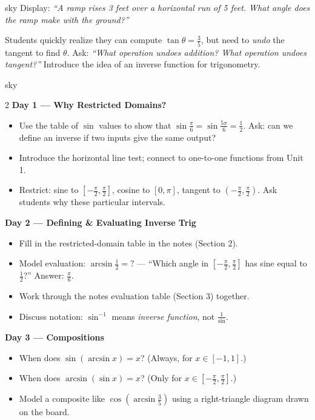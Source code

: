 \documentclass[10pt]{article}
\begin{document}
\begin{skillbox}[Hook]{sky}
    Display: \textit{``A ramp rises 3 feet over a horizontal run of 5 feet.
    What angle does the ramp make with the ground?''}

    Students quickly realize they can compute $\tan\theta = \tfrac{3}{5}$, but
    need to \emph{undo} the tangent to find $\theta$.  Ask: \textit{``What
    operation undoes addition?  What operation undoes tangent?''}  Introduce
    the idea of an inverse function for trigonometry.
\end{skillbox}

\begin{skillbox}[Lesson]{sky}
\begin{multicols}{2}
\textbf{Day 1 --- Why Restricted Domains?}
\begin{itemize}[leftmargin=1.4em, itemsep=2pt]
    \item Use the table of $\sin$ values to show that $\sin\tfrac{\pi}{6} =
          \sin\tfrac{5\pi}{6} = \tfrac{1}{2}$. Ask: can we define an inverse
          if two inputs give the same output?
    \item Introduce the horizontal line test; connect to one-to-one functions
          from Unit 1.
    \item Restrict: sine to $[-\tfrac{\pi}{2}, \tfrac{\pi}{2}]$, cosine to
          $[0,\pi]$, tangent to $(-\tfrac{\pi}{2}, \tfrac{\pi}{2})$.  Ask
          students why these particular intervals.
\end{itemize}

\columnbreak

\textbf{Day 2 --- Defining \& Evaluating Inverse Trig}
\begin{itemize}[leftmargin=1.4em, itemsep=2pt]
    \item Fill in the restricted-domain table in the notes (Section 2).
    \item Model evaluation: $\arcsin\tfrac{1}{2} = ?$ --- ``Which angle in
          $[-\tfrac{\pi}{2}, \tfrac{\pi}{2}]$ has sine equal to $\tfrac{1}{2}$?''
          Answer: $\tfrac{\pi}{6}$.
    \item Work through the notes evaluation table (Section 3) together.
    \item Discuss notation: $\sin^{-1}$ means \emph{inverse function}, not
          $\frac{1}{\sin}$.
\end{itemize}
\end{multicols}
\textbf{Day 3 --- Compositions}
\begin{itemize}[leftmargin=1.4em, itemsep=2pt]
    \item When does $\sin(\arcsin x) = x$?  (Always, for $x \in [-1,1]$.)
    \item When does $\arcsin(\sin x) = x$?  (Only for $x \in [-\tfrac{\pi}{2}, \tfrac{\pi}{2}]$.)
    \item Model a composite like $\cos(\arcsin\tfrac{3}{5})$ using a
          right-triangle diagram drawn on the board.
\end{itemize}
\end{skillbox}
\end{document}
